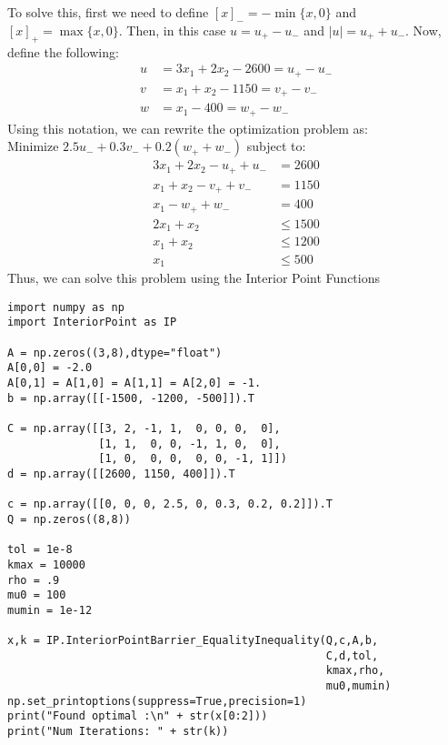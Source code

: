 \documentclass[11pt]{article}
\begin{document}
To solve this, first we need to define \(\left[x\right]_- = - \min\{x,0\}\) and \(\left[x\right]_+ = \max\{x,0\}\).
Then, in this case \(u = u_+ - u_-\) and \(\lvert u \rvert = u_+ + u_-\).
Now, define the following:
\begin{align*}
  u &= 3x_1 + 2x_2 - 2600 = u_+ - u_- \\
  v &= x_1 + x_2 - 1150 = v_+ - v_- \\
  w &= x_1 - 400 = w_+ - w_-
\end{align*}
Using this notation, we can rewrite the optimization problem as: \\
Minimize \(2.5 u_- + 0.3 v_- + 0.2 (w_+ + w_-)\) subject to:
\begin{align*}
  3x_1 + 2x_2 - u_+ + u_- &= 2600 \\
  x_1 + x_2 - v_+ + v_- &= 1150 \\
  x_1 - w_+ + w_- &= 400 \\
  2x_1 + x_2 &\leq 1500 \\
  x_1 + x_2 &\leq 1200 \\
  x_1 &\leq 500
\end{align*}
Thus, we can solve this problem using the Interior Point Functions

\begin{verbatim}
import numpy as np
import InteriorPoint as IP

A = np.zeros((3,8),dtype="float")
A[0,0] = -2.0
A[0,1] = A[1,0] = A[1,1] = A[2,0] = -1.
b = np.array([[-1500, -1200, -500]]).T

C = np.array([[3, 2, -1, 1,  0, 0, 0,  0],
              [1, 1,  0, 0, -1, 1, 0,  0],
              [1, 0,  0, 0,  0, 0, -1, 1]])
d = np.array([[2600, 1150, 400]]).T

c = np.array([[0, 0, 0, 2.5, 0, 0.3, 0.2, 0.2]]).T
Q = np.zeros((8,8))

tol = 1e-8
kmax = 10000
rho = .9
mu0 = 100
mumin = 1e-12

x,k = IP.InteriorPointBarrier_EqualityInequality(Q,c,A,b,
                                                 C,d,tol,
                                                 kmax,rho,
                                                 mu0,mumin)
np.set_printoptions(suppress=True,precision=1)
print("Found optimal :\n" + str(x[0:2]))
print("Num Iterations: " + str(k))
\end{verbatim}
\end{document}
